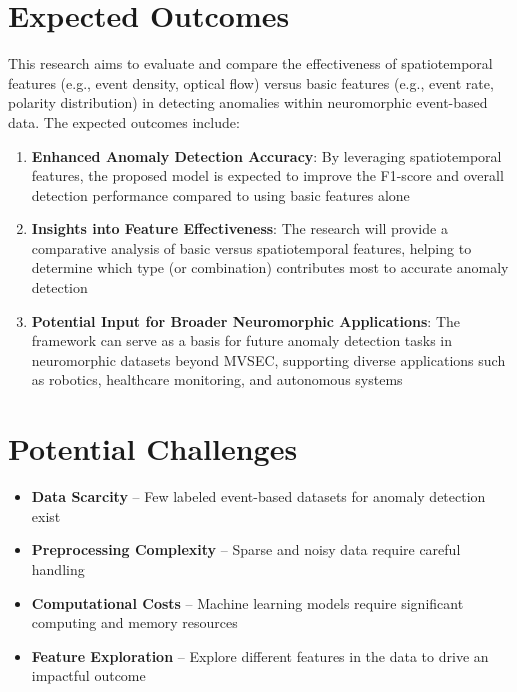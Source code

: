 \documentclass[12pt,a4paper]{article}
\begin{document}
\section{Expected Outcomes}

This research aims to evaluate and compare the effectiveness of spatiotemporal features (e.g., event density, optical flow) versus basic features (e.g., event rate, polarity distribution) in detecting anomalies within neuromorphic event-based data. The expected outcomes include:

\begin{enumerate}
    \item \textbf{Enhanced Anomaly Detection Accuracy}: By leveraging spatiotemporal features, the proposed model is expected to improve the F1-score and overall detection performance compared to using basic features alone
    
    \item \textbf{Insights into Feature Effectiveness}: The research will provide a comparative analysis of basic versus spatiotemporal features, helping to determine which type (or combination) contributes most to accurate anomaly detection
    
    \item \textbf{Potential Input for Broader Neuromorphic Applications}: The framework can serve as a basis for future anomaly detection tasks in neuromorphic datasets beyond MVSEC, supporting diverse applications such as robotics, healthcare monitoring, and autonomous systems
\end{enumerate}

\section{Potential Challenges}

\begin{itemize}
    \item \textbf{Data Scarcity} -- Few labeled event-based datasets for anomaly detection exist
    \item \textbf{Preprocessing Complexity} -- Sparse and noisy data require careful handling
    \item \textbf{Computational Costs} -- Machine learning models require significant computing and memory resources
    \item \textbf{Feature Exploration} -- Explore different features in the data to drive an impactful outcome
\end{itemize}
\end{document}
